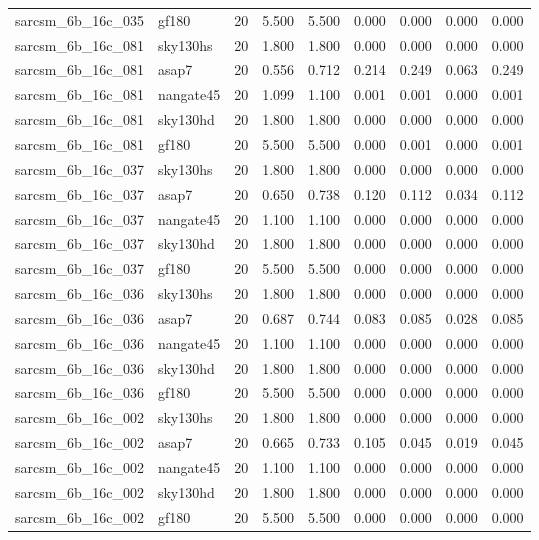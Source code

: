 \begin{tabular}{llrrrrrrr}
sarcsm\_6b\_16c\_035 & gf180 & 20 & 5.500 & 5.500 & 0.000 & 0.000 & 0.000 & 0.000 \\
sarcsm\_6b\_16c\_081 & sky130hs & 20 & 1.800 & 1.800 & 0.000 & 0.000 & 0.000 & 0.000 \\
sarcsm\_6b\_16c\_081 & asap7 & 20 & 0.556 & 0.712 & 0.214 & 0.249 & 0.063 & 0.249 \\
sarcsm\_6b\_16c\_081 & nangate45 & 20 & 1.099 & 1.100 & 0.001 & 0.001 & 0.000 & 0.001 \\
sarcsm\_6b\_16c\_081 & sky130hd & 20 & 1.800 & 1.800 & 0.000 & 0.000 & 0.000 & 0.000 \\
sarcsm\_6b\_16c\_081 & gf180 & 20 & 5.500 & 5.500 & 0.000 & 0.001 & 0.000 & 0.001 \\
sarcsm\_6b\_16c\_037 & sky130hs & 20 & 1.800 & 1.800 & 0.000 & 0.000 & 0.000 & 0.000 \\
sarcsm\_6b\_16c\_037 & asap7 & 20 & 0.650 & 0.738 & 0.120 & 0.112 & 0.034 & 0.112 \\
sarcsm\_6b\_16c\_037 & nangate45 & 20 & 1.100 & 1.100 & 0.000 & 0.000 & 0.000 & 0.000 \\
sarcsm\_6b\_16c\_037 & sky130hd & 20 & 1.800 & 1.800 & 0.000 & 0.000 & 0.000 & 0.000 \\
sarcsm\_6b\_16c\_037 & gf180 & 20 & 5.500 & 5.500 & 0.000 & 0.000 & 0.000 & 0.000 \\
sarcsm\_6b\_16c\_036 & sky130hs & 20 & 1.800 & 1.800 & 0.000 & 0.000 & 0.000 & 0.000 \\
sarcsm\_6b\_16c\_036 & asap7 & 20 & 0.687 & 0.744 & 0.083 & 0.085 & 0.028 & 0.085 \\
sarcsm\_6b\_16c\_036 & nangate45 & 20 & 1.100 & 1.100 & 0.000 & 0.000 & 0.000 & 0.000 \\
sarcsm\_6b\_16c\_036 & sky130hd & 20 & 1.800 & 1.800 & 0.000 & 0.000 & 0.000 & 0.000 \\
sarcsm\_6b\_16c\_036 & gf180 & 20 & 5.500 & 5.500 & 0.000 & 0.000 & 0.000 & 0.000 \\
sarcsm\_6b\_16c\_002 & sky130hs & 20 & 1.800 & 1.800 & 0.000 & 0.000 & 0.000 & 0.000 \\
sarcsm\_6b\_16c\_002 & asap7 & 20 & 0.665 & 0.733 & 0.105 & 0.045 & 0.019 & 0.045 \\
sarcsm\_6b\_16c\_002 & nangate45 & 20 & 1.100 & 1.100 & 0.000 & 0.000 & 0.000 & 0.000 \\
sarcsm\_6b\_16c\_002 & sky130hd & 20 & 1.800 & 1.800 & 0.000 & 0.000 & 0.000 & 0.000 \\
sarcsm\_6b\_16c\_002 & gf180 & 20 & 5.500 & 5.500 & 0.000 & 0.000 & 0.000 & 0.000 \\

\end{tabular}
